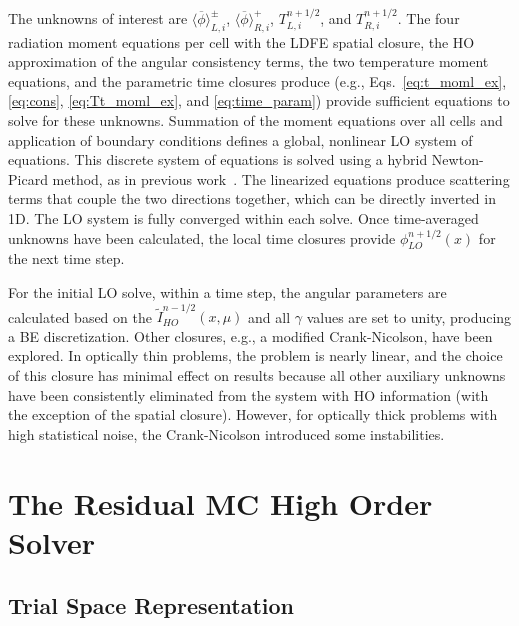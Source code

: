 \documentclass{anstrans}
\newcommand{\mom}[1]{\langle #1 \rangle}
\begin{document}
The unknowns of interest are $\mom{\overline{\phi}}_{L,i}^\pm$,
$\mom{\overline{\phi}}_{R,i}^+$, $T_{L,i}^{n+1/2}$, and $T_{R,i}^{n+1/2}$. 
The four radiation moment equations per cell with the LDFE spatial closure, the HO approximation of the
angular consistency terms, the two temperature moment equations, and the parametric time closures produce
(e.g., Eqs.~\eqref{eq:t_moml_ex}, \eqref{eq:cons}, \eqref{eq:Tt_moml_ex},
and \eqref{eq:time_param}) provide sufficient equations to solve for these unknowns.  Summation of the
moment equations over all cells and application of boundary conditions defines a global, nonlinear
LO system of equations.  This discrete system of equations is solved using a hybrid Newton-Picard method, as in
previous work~\cite{bolding_nse}. The linearized equations produce scattering terms that couple the
two directions together, which can be directly inverted in 1D.  The LO system is fully converged within each solve.
Once time-averaged unknowns have been calculated, the local time closures provide
$\phi_{LO}^{n+1/2}(x)$ for the next time step.   

For the initial LO solve, within a time step, the angular parameters
are calculated based on the $\tilde I_{HO}^{n-1/2}(x,\mu)$ and all $\gamma$ values 
are set to unity, producing a BE discretization.
Other closures, e.g., a modified Crank-Nicolson, have been explored.  In optically 
thin problems, the problem is nearly linear, and the choice of this closure has minimal
effect on results because all other auxiliary unknowns have been consistently eliminated from the system
with HO information (with the exception of the spatial closure).  However, for optically thick
problems with high statistical noise, the Crank-Nicolson introduced some instabilities.

\section{The Residual MC High Order Solver}
\label{sec:ho}

\subsection{Trial Space Representation}
\end{document}

